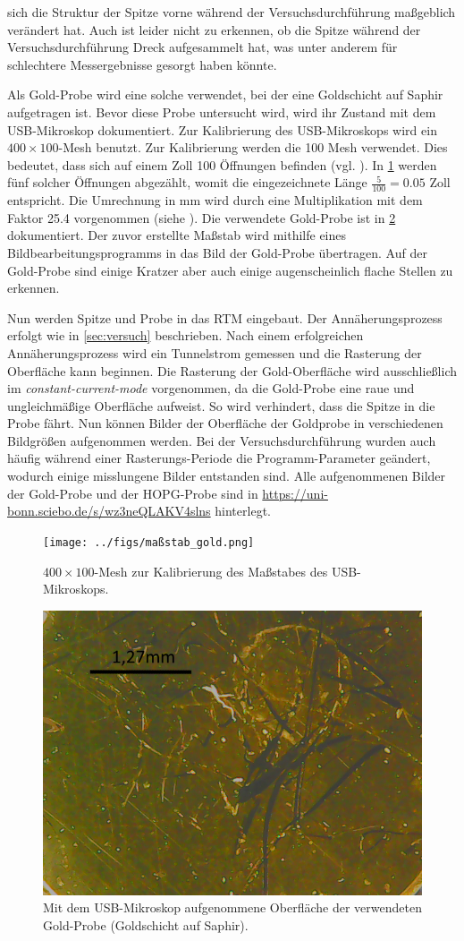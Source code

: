 sich die Struktur der Spitze vorne während der Versuchsdurchführung maßgeblich verändert hat. Auch ist leider nicht zu erkennen, ob die Spitze
während der Versuchsdurchführung Dreck aufgesammelt hat, was unter anderem für schlechtere Messergebnisse gesorgt haben könnte.\par
Als Gold-Probe wird eine solche verwendet, bei der eine Goldschicht auf Saphir aufgetragen ist. Bevor diese Probe untersucht wird, wird
ihr Zustand mit dem USB-Mikroskop dokumentiert. Zur Kalibrierung des USB-Mikroskops wird ein $400 \times 100$-Mesh benutzt. Zur Kalibrierung werden
die \num{100} Mesh verwendet. Dies bedeutet, dass sich auf einem Zoll \num{100} Öffnungen befinden (vgl. \cite{mesh}). In \cref{fig:maßstab_gold} werden fünf solcher
Öffnungen abgezählt, womit die eingezeichnete Länge $\frac{5}{100} = \num{0,05}$ Zoll entspricht. Die Umrechnung in \unit{\milli \meter} wird durch eine
Multiplikation mit dem Faktor \num{25,4} vorgenommen (siehe \cite{umrechnung}). Die verwendete Gold-Probe ist in \cref{fig:gold_saphir} dokumentiert.
Der zuvor erstellte Maßstab wird mithilfe eines Bildbearbeitungsprogramms in das Bild der Gold-Probe übertragen. Auf der Gold-Probe sind einige Kratzer
aber auch einige augenscheinlich flache Stellen zu erkennen.\par
Nun werden Spitze und Probe in das RTM eingebaut. Der Annäherungsprozess erfolgt wie in \cref{sec:versuch} beschrieben. Nach einem erfolgreichen
Annäherungsprozess wird ein Tunnelstrom gemessen und die Rasterung der Oberfläche kann beginnen. Die Rasterung der Gold-Oberfläche wird ausschließlich
im \textit{constant-current-mode} vorgenommen, da die Gold-Probe eine raue und ungleichmäßige Oberfläche aufweist. So wird verhindert, dass die
Spitze in die Probe fährt. Nun können Bilder der Oberfläche der Goldprobe in verschiedenen Bildgrößen aufgenommen werden. Bei der Versuchsdurchführung
wurden auch häufig während einer Rasterungs-Periode die Programm-Parameter geändert, wodurch einige misslungene Bilder entstanden sind.
Alle aufgenommenen Bilder der
Gold-Probe und der HOPG-Probe sind in \url{https://uni-bonn.sciebo.de/s/wz3neQLAKV4slns} hinterlegt.
\begin{figure}[H]
	\centering
	\texttt{[image: ../figs/maßstab\_gold.png]}
	\caption{$400 \times 100$-Mesh zur Kalibrierung des Maßstabes des USB-Mikroskops.}
	\label{fig:maßstab_gold}
\end{figure}
\begin{figure}[H]
	\centering
	\includegraphics[width=0.6\linewidth]{../figs/gold_saphir.png}
	\caption{Mit dem USB-Mikroskop aufgenommene Oberfläche der verwendeten Gold-Probe (Goldschicht auf Saphir).}
	\label{fig:gold_saphir}
\end{figure}
